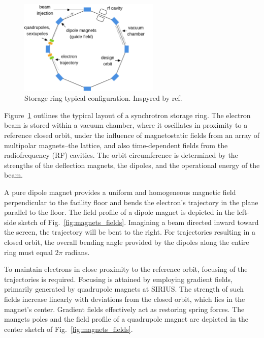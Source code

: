 \begin{figure}[tb]
    \centering
    \includegraphics[width=0.6\textwidth]{Images/storage_ring.png}
    \caption{Storage ring typical configuration. Inspyred by ref.~\cite{sands_physics_1969}}
    \label{fig:storage_ring}
\end{figure}
Figure~\ref{fig:storage_ring} outlines the typical layout of a synchrotron storage ring. The electron beam is stored within a vacuum chamber, where it oscillates in proximity to a reference closed orbit, under the influence of magnetostatic fields from an array of multipolar magnets--the lattice, and also time-dependent fields from the radiofrequency (RF) cavities. The orbit circumference is determined by the strengths of the deflection magnets, the dipoles, and the operational energy of the beam.

A pure dipole magnet provides a uniform and homogeneous magnetic field perpendicular to the facility floor and bends the electron's trajectory in the plane parallel to the floor. The field profile of a dipole magnet is depicted in the left-side sketch of Fig.~\ref{fig:magnets_fields}. Imagining a beam directed inward toward the screen, the trajectory will be bent to the right. For trajectories resulting in a closed orbit, the overall bending angle provided by the dipoles along the entire ring must equal $2\pi$ radians.

To maintain electrons in close proximity to the reference orbit, focusing of the trajectories is required. Focusing is attained by employing gradient fields, primarily generated by quadrupole magnets at SIRIUS. The strength of such fields increase linearly with deviations from the closed orbit, which lies in the magnet's center. Gradient fields effectively act as restoring spring forces. The mangets poles and the field profile of a quadrupole magnet are depicted in the center sketch of Fig.~\ref{fig:magnets_fields}.

